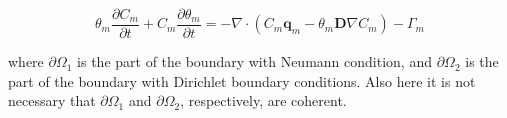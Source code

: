 \documentclass{report}
\begin{document}
%


\begin{equation}
 \theta_{m} \frac{\partial C_{m}}{\partial t} + C_{m} \frac{\partial
  \theta_{m}}{\partial t} =  -\nabla \cdot(C_{m}
  \mathbf{q}_{m}-\theta_{m}
  \mathbf{D}\nabla C_{m})- \Gamma_{m}
\label{eq:solutemovement}
\end{equation}



where $\partial \Omega_1$ is the part of the boundary with Neumann
condition, and $\partial \Omega_2$ is the part of the boundary with
Dirichlet boundary conditions. Also here it is not necessary that
$\partial \Omega_1$ and $\partial \Omega_2$, respectively, are
coherent.
\end{document}
